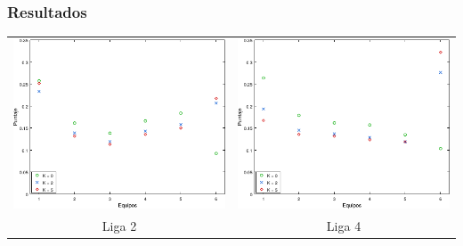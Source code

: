             \subsubsection*{Resultados}
            \noindent{} \begin{minipage}{\textwidth}
                \begin{center}
                    \vspace{1em}

                    \begin{tabular}{cc}
                        \includegraphics{graficos/exp3-partidos-liga2-K.pdf} & \includegraphics{graficos/exp3-partidos-liga4-K} \\
                        {\small Liga 2}                                      & {\small Liga 4}
                    \end{tabular}
                \end{center}
            \end{minipage}

